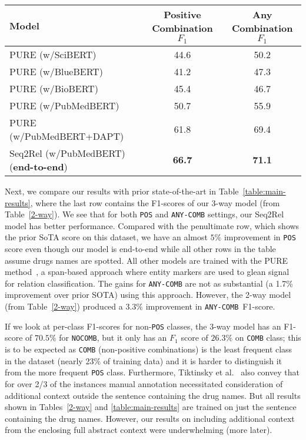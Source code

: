 \documentclass[conference]{IEEEtran}
\begin{document}
\begin{table*}[!ht] 
  \centering
  \renewcommand{\arraystretch}{1.4}
    \caption{Our results (last row) compared with different baseline foundation models (DAPT means with continued domain-adaptive pretraining~\cite{gururangan-etal-2020-dont}) trained with the PURE method \cite{zhong-chen-2021-frustratingly}. The baseline results (first 5 rows) are from Tiktinsky et al.~\cite{tiktinsky-etal-2022-dataset}.
  }
  \begin{tabular}{lcc} 
  \toprule
  \textbf{Model} & \multicolumn{1}{c}{\textbf{Positive Combination $F_1$}} & \multicolumn{1}{c}{\textbf{Any Combination $F_1$}}\\\midrule
  PURE (w/SciBERT)  & 44.6  & 50.2\\ 
  PURE (w/BlueBERT)  & 41.2  & 47.3\\ 
  PURE (w/BioBERT)  & 45.4  & 46.7\\ 
  PURE (w/PubMedBERT)  & 50.7  & 55.9\\ \bottomrule
  PURE (w/PubMedBERT+DAPT)  & 61.8  & 69.4\\ \bottomrule
  Seq2Rel (w/PubMedBERT) (\textbf{\color{blue}end-to-end})& \textbf{66.7}  & \textbf{71.1}\\
  \bottomrule
  \end{tabular}
   \label{table:main-results}
\end{table*}

Next, we compare our results with prior state-of-the-art  in Table~\ref{table:main-results}, where the last row contains the F1-scores of our 3-way model (from Table~\ref{2-way}).
We  see that for both \texttt{POS} and \texttt{ANY-COMB} settings, our Seq2Rel model has better performance. Compared with the penultimate row, which shows the prior SoTA score on this dataset, we have an almost $5\%$ improvement in \texttt{POS} score even though our model is end-to-end while all other rows in the table assume drugs names are spotted.  All other models are trained with the PURE method~\cite{zhong-chen-2021-frustratingly}, a span-based approach where entity markers are   used to glean signal for relation classification. The gains for \texttt{ANY-COMB} are not as substantial (a 1.7\% improvement over prior SOTA) using this approach. However, the 2-way model (from Table~\ref{2-way}) produced a $3.3\%$ improvement in \texttt{ANY-COMB}~F1-score. 

If we look at per-class F1-scores for non-\texttt{POS} classes, the 3-way model has an F1-score of $70.5\%$ for \texttt{NOCOMB}, but it only has an $F_1$ score of $26.3\%$ on \texttt{COMB} class; this is to be expected as \texttt{COMB} (non-positive combinations) is the least frequent class in the dataset (nearly 23\% of training data) and it is harder to distinguish it from the more frequent \texttt{POS} class.  Furthermore, Tiktinsky et al.~\cite{tiktinsky-etal-2022-dataset} also convey that for over 2/3 of the instances manual annotation necessitated consideration of additional context outside the sentence containing the drug names. But all results shown in Tables~\ref{2-way} and \ref{table:main-results} are trained on just the sentence containing the drug names. However, our results on including additional context from the enclosing full abstract context were underwhelming (more later). 
\end{document}
